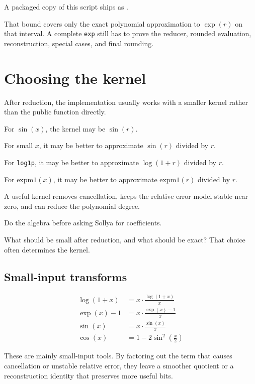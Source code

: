 \documentclass[manuscript, nonacm]{acmart}
\begin{document}
  A packaged copy of this script ships as
  .

  That bound covers only the exact polynomial approximation to $\exp(r)$ on
  that interval. A complete \texttt{exp} still has to prove the reducer,
  rounded evaluation, reconstruction, special cases, and final rounding.



  \section{Choosing the kernel}
  \label{sec:kernel}

  After reduction, the implementation usually works with a smaller kernel rather
  than the public function directly.


  For $\sin(x)$, the kernel may be $\sin(r)$.

  For small $x$, it may be better to approximate $\sin(r)$ divided by $r$.

  For \texttt{log1p}, it may be better to approximate $\log(1+r)$
  divided by $r$.

  For $\mathrm{expm1}(x)$, it may be better to approximate
  $\mathrm{expm1}(r)$ divided by $r$.

  A useful kernel removes cancellation, keeps the relative error model stable near
  zero, and can reduce the polynomial degree.

  Do the algebra before asking Sollya for coefficients.

  What should be small after reduction, and what should be exact? That choice
  often determines the kernel.

  \subsection{Small-input transforms}
  \begin{align*}
    \log(1+x) &= x \cdot \frac{\log(1+x)}{x} \\[4pt]
    \exp(x)-1  &= x \cdot \frac{\exp(x)-1}{x} \\[4pt]
    \sin(x)    &= x \cdot \frac{\sin(x)}{x} \\[4pt]
    \cos(x)    &= 1 - 2\sin^2\!\left(\tfrac{x}{2}\right)
  \end{align*}

  These are mainly small-input tools. By factoring out the term that causes
  cancellation or unstable relative error, they leave a smoother quotient or a
  reconstruction identity that preserves more useful bits.
\end{document}
